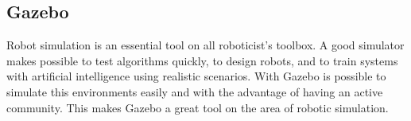 
\subsection{Gazebo}

Robot simulation is an essential tool on all roboticist's toolbox.
A good simulator makes possible to test algorithms quickly, to design robots, and to train systems with artificial intelligence using realistic scenarios.
With Gazebo \cite{fairchild2016ros} is possible to simulate this environments easily and with the advantage of having an active community.
This makes Gazebo a great tool on the area of robotic simulation.
